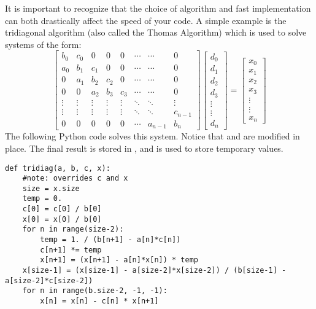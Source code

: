 It is important to recognize that the choice of algorithm and fast implementation can both drastically affect the speed of your code.
A simple example is the tridiagonal algorithm (also called the Thomas Algorithm) which is used to solve systems of the form:
\[
\begin{bmatrix}
b_0 & c_0 & 0 & 0 & 0 & \cdots & \cdots & 0 \\
a_0 & b_1 & c_1 & 0 & 0 & \cdots & \cdots & 0 \\
0 & a_1 & b_2 & c_2 & 0 & \cdots & \cdots & 0 \\
0 & 0 & a_2 & b_3 & c_3 & \cdots & \cdots & 0 \\
\vdots & \vdots & \vdots & \vdots & \vdots & \ddots & \ddots & \vdots \\
\vdots & \vdots & \vdots & \vdots & \vdots & \ddots & \ddots & c_{n-1} \\
0 & 0 & 0 & 0 & 0 & \cdots & a_{n-1} & b_n
\end{bmatrix}
\begin{bmatrix}
d_0\\
d_1\\
d_2\\
d_3\\
\vdots\\
\vdots\\
d_n
\end{bmatrix}
=
\begin{bmatrix}
x_0\\
x_1\\
x_2\\
x_3\\
\vdots\\
\vdots\\
x_n
\end{bmatrix}
\]
The following Python code solves this system.
Notice that  and  are modified in place.
The final result is stored in , and  is used to store temporary values.
\begin{lstlisting}
def tridiag(a, b, c, x):
    #note: overrides c and x
    size = x.size
    temp = 0.
    c[0] = c[0] / b[0]
    x[0] = x[0] / b[0]
    for n in range(size-2):
        temp = 1. / (b[n+1] - a[n]*c[n])
        c[n+1] *= temp
        x[n+1] = (x[n+1] - a[n]*x[n]) * temp
    x[size-1] = (x[size-1] - a[size-2]*x[size-2]) / (b[size-1] - a[size-2]*c[size-2])
    for n in range(b.size-2, -1, -1):
        x[n] = x[n] - c[n] * x[n+1]
\end{lstlisting}

